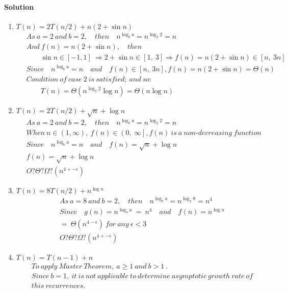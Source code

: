 \documentclass[a4paper]{scrartcl}
\begin{document}
\paragraph{Solution}
\begin{enumerate}[label=(\alph*)]
  \item $T (n) = 2T (n/2) + n(2 + \sin{n})$
\begin{align*}
  &\ As\ a = 2\ and\ b = 2,\quad then \quad n^{\log_b{a}} = n^{\log_2{2}} = n\\
  &\ And\ f(n) = n(2 + \sin{n}),\quad then\\ &\
  \qquad \sin{n} \in \left[-1, 1\right]\ \Rightarrow 2+\sin{n} \in \left[1,\ 3\right] \Rightarrow f(n) = n\left(2 + \sin{n}\right) \in \left[n,\ 3n\right]\\ &\
  Since\quad n^{\log_b{a}} = n \quad and \quad f(n) \in \left[n,\ 3n\right], f(n) = n(2 + \sin{n}) = \Theta(n)\\ &\
  Condition\ of\ case\ 2\ is\ satisfied;\ and\ so:\\
  &\ \qquad T(n)=\Theta\left({n^{\log_2{2}}\log{n}}\right) =\Theta\left({n\log{n}}\right)
\end{align*}
\item $T (n) = 2T (n/2) + \sqrt{n} + \log{n}$
\begin{align*}
  &\ As\ a = 2\ and\ b = 2,\quad then \quad n^{\log_b{a}} = n^{\log_2{2}} = n\\
  &\ When\ n \in \left(1, \infty\right),\ f(n) \in \left(0,\ \infty\right], f(n)\ is\ a\ non\text{-}decreasing\ function\\ &\
  Since\quad n^{\log_b{a}} = n \quad and \quad f(n) = \sqrt{n} + \log{n}\\ &\
  f(n) = \sqrt{n} + \log{n} \\ &\
  O? \Theta ? \Omega ? (n^{4+-\epsilon})
\end{align*}
\item $T (n) = 8T (n/2) + n^{\log{n}}$
\begin{align*}
  &\ As\ a = 8\ and\ b = 2,\quad then \quad n^{\log_b{a}} = n^{\log_2{8}} = n^4\\ &\
  Since\quad g(n)=n^{\log_b{a}}\ =\ n^4 \quad and \quad f(n) = n^{\log{n}}\\ &\
  =\ \Theta(n^{4-\epsilon})\ for\ any\ \epsilon < 3\\ &\
  O? \Theta ? \Omega ? (n^{4+-\epsilon})
\end{align*}
\item $T (n) = T (n - 1) + n$
\begin{align*}
  &\ To\ apply\ Master\ Theorem,\ a \geq 1\ and\ b > 1\ .\\ &\
  Since\ b = 1,\ it\ is\ not\ applicable\ to\ determine\ asymptotic\ growth\ rate\ of\\ &\
  this\ recurrences.
\end{align*}
\end{enumerate}
\end{document}
